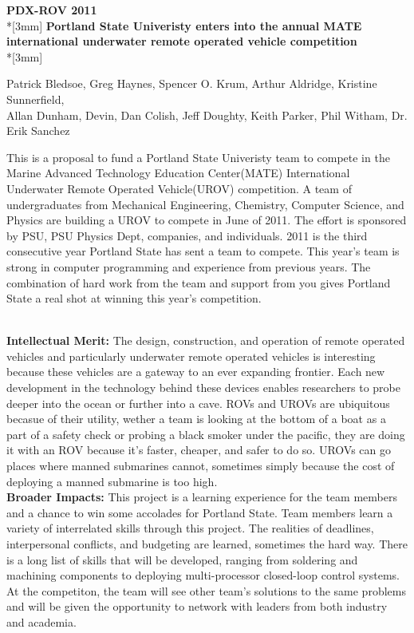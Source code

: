 \documentclass{proposalnsf}
\begin{document}
\begin{center}
{\Large{\bf PDX-ROV 2011}}\\*[3mm]
{\bf Portland State Univeristy enters into the annual MATE international underwater remote operated vehicle competition} \\*[3mm]

Patrick Bledsoe, Greg Haynes, Spencer O. Krum, Arthur Aldridge, Kristine Sunnerfield,\\
 Allan Dunham, Devin, Dan Colish, Jeff Doughty, Keith Parker, Phil Witham, Dr. Erik Sanchez

\end{center}


This is a  proposal to fund a Portland State Univeristy team to compete in the Marine Advanced Technology Education Center(MATE)
 International Underwater Remote Operated Vehicle(UROV) competition. A team of undergraduates from Mechanical Engineering,
 Chemistry, Computer Science, and Physics are building a UROV to compete in June of 2011. The effort is sponsored by PSU, 
PSU Physics Dept, companies, and individuals. 2011 is the third consecutive year Portland State has sent a team to compete.
This year's team is strong in computer programming and experience from previous years. The combination of hard work from the team and 
support from you gives Portland State a real shot at winning this year's competition.  



\ \\
\noindent
{\bf Intellectual Merit:}
The design, construction, and operation of remote operated vehicles and particularly underwater remote operated vehicles is interesting
because these vehicles are a gateway to an ever expanding frontier. Each new development in the technology behind these devices enables 
researchers to probe deeper into the ocean or further into a cave. ROVs and UROVs are ubiquitous becasue of their utility, wether a team
is looking at the bottom of a boat as a part of a safety check or probing a black smoker under the pacific, they are doing it with an ROV
because it's faster, cheaper, and safer to do so. UROVs can go places where manned submarines cannot, sometimes simply because the cost 
of deploying a manned submarine is too high.  
\ \\

\noindent
{\bf Broader Impacts:}
This project is a learning experience for the team members and a chance to win some accolades for Portland State. Team members learn 
a variety of interrelated skills through this project. The realities of deadlines, interpersonal conflicts, and budgeting are learned, 
sometimes the hard way. There is a long list of skills that will be developed, ranging from soldering and machining components to deploying 
multi-processor closed-loop control systems. At the competiton, the team will see other team's solutions to the same problems and will be
 given the opportunity to network with leaders from both industry and academia. 
\renewcommand{\thepage} {B--\arabic{page}}
\end{document}
